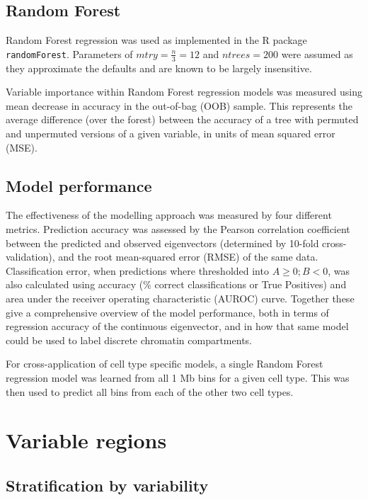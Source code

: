 \documentclass[a4paper,10pt,oneside]{book}
\begin{document}
\subsection{Random Forest}\label{sec:rf}

Random Forest regression\citep{Breiman2001a} was used as implemented in
the R package \texttt{randomForest}.\citep{Liaw2002} Parameters of
$mtry = \frac{n}{3} = 12$ and $ntrees = 200$ were assumed as they
approximate the defaults and are known to be largely
insensitive.\citep{Hastie2001}

Variable importance within Random Forest regression models was measured
using mean decrease in accuracy in the out-of-bag (OOB) sample. This
represents the average difference (over the forest) between the accuracy
of a tree with permuted and unpermuted versions of a given variable, in
units of mean squared error (MSE).\citep{Cutler2007}

\subsection{Model performance}\label{model-performance}

The effectiveness of the modelling approach was measured by four
different metrics. Prediction accuracy was assessed by the Pearson
correlation coefficient between the predicted and observed eigenvectors
(determined by 10-fold cross-validation), and the root mean-squared
error (RMSE) of the same data. Classification error, when predictions
where thresholded into $A \geq 0; B < 0$, was also calculated using
accuracy (\% correct classifications or True Positives) and area under
the receiver operating characteristic (AUROC) curve. Together these give
a comprehensive overview of the model performance, both in terms of
regression accuracy of the continuous eigenvector, and in how that same
model could be used to label discrete chromatin compartments.

For cross-application of cell type specific models, a single Random
Forest regression model was learned from all 1 Mb bins for a given cell
type. This was then used to predict all bins from each of the other two
cell types.

\section{Variable regions}\label{variable-regions}

\subsection{Stratification by
variability}\label{stratification-by-variability}
\end{document}
